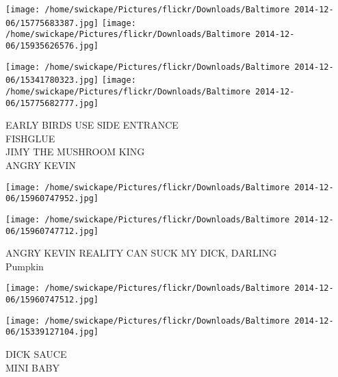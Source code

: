 \documentclass[10pt,letterpaper]{article}
\begin{document}
\texttt{[image: /home/swickape/Pictures/flickr/Downloads/Baltimore 2014-12-06/15775683387.jpg]}
\texttt{[image: /home/swickape/Pictures/flickr/Downloads/Baltimore 2014-12-06/15935626576.jpg]}

\texttt{[image: /home/swickape/Pictures/flickr/Downloads/Baltimore 2014-12-06/15341780323.jpg]}
\texttt{[image: /home/swickape/Pictures/flickr/Downloads/Baltimore 2014-12-06/15775682777.jpg]}

EARLY BIRDS USE SIDE ENTRANCE\\
FISHGLUE\\
JIMY THE MUSHROOM KING\\
ANGRY KEVIN\\
\pagebreak

\texttt{[image: /home/swickape/Pictures/flickr/Downloads/Baltimore 2014-12-06/15960747952.jpg]}

\vspace{0.25in}
\texttt{[image: /home/swickape/Pictures/flickr/Downloads/Baltimore 2014-12-06/15960747712.jpg]}

ANGRY KEVIN REALITY CAN SUCK MY DICK, DARLING\\
Pumpkin\\
\pagebreak

\texttt{[image: /home/swickape/Pictures/flickr/Downloads/Baltimore 2014-12-06/15960747512.jpg]}

\vspace{0.25in}
\texttt{[image: /home/swickape/Pictures/flickr/Downloads/Baltimore 2014-12-06/15339127104.jpg]}

DICK SAUCE\\
MINI BABY\\
\pagebreak
\end{document}
